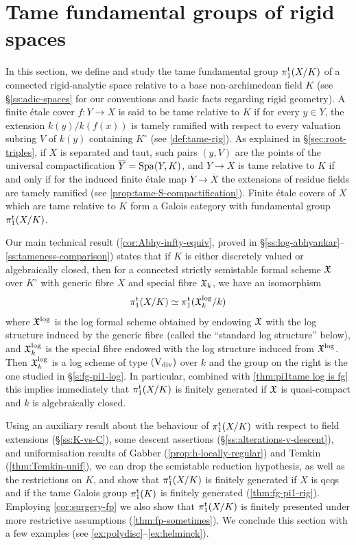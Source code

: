 \section{Tame fundamental groups of rigid spaces}
\label{s:fg-pi1-rig}


In this section, we define and study the tame fundamental group $\pi_1^{\mathrm{t}}(X/K)$ of a connected rigid-analytic space relative to a base non-archimedean field $K$ (see \S\ref{ss:adic-spaces} for our conventions and basic facts regarding rigid geometry). A finite \'etale cover $f\colon Y\to X$ is said to be tame relative to $K$ if for every $y\in Y$, the extension $k(y)/k(f(x))$ is tamely ramified with respect to every valuation subring $V$ of $k(y)$ containing $K^\circ$ (see \cref{def:tame-rig}). As explained in \S\ref{sec:root-triples}, if $X$ is separated and taut, such pairs $(y,V)$ are the points of the universal compactification $\overline{Y} = \operatorname{Spa}(Y, K)$, and $Y\to X$ is tame relative to $K$ if and only if for the induced finite \'etale map $\overline{Y}\to \overline{X}$ the extensions of residue fields are tamely ramified (see \cref{prop:tame-S-compactification}). Finite \'etale covers of $X$ which are tame relative to $K$ form a Galois category with fundamental group~$\pi_1^{\mathrm{t}}(X/K)$.

Our main technical result (\cref{cor:Abhy-infty-equiv}, proved in \S\ref{ss:log-abhyankar}--\ref{ss:tameness-comparison}) states that if $K$ is either discretely valued or algebraically closed, then for a connected strictly semistable formal scheme ${\mathfrak{X}}$ over $K^\circ$ with generic fibre $X$ and special fibre ${\mathfrak{X}}_k$, we have an isomorphism
\[
    \pi_1^{\mathrm{t}}(X/K) \simeq \pi_1^{\mathrm{t}}({\mathfrak{X}}^{\rm log}_k/k)
\]
where ${\mathfrak{X}}^{\rm log}$ is the log formal scheme obtained by endowing ${\mathfrak{X}}$ with the log structure induced by the generic fibre (called the ``standard log structure'' below), and ${\mathfrak{X}}^{\rm log}_k$ is the special fibre endowed with the log structure induced from ${\mathfrak{X}}^{\rm log}$. Then ${\mathfrak{X}}^{\rm log}_k$ is a log scheme of type $(\mathrm{V}_{\rm div})$ over $k$ and the group on the right is the one studied in \S\ref{s:fg-pi1-log}. In particular, combined with \cref{thm:pi1tame log is fg} this implies immediately that $\pi_1^{\mathrm{t}}(X/K)$ is finitely generated if ${\mathfrak{X}}$ is quasi-compact and $k$ is algebraically closed. 

Using an auxiliary result about the behaviour of $\pi_1^{\mathrm{t}}(X/K)$ with respect to field extensions (\S\ref{ss:K-vs-C}), some descent assertions (\S\ref{ss:alterations-v-descent}), and uniformisation results of Gabber (\cref{prop:h-locally-regular}) and Temkin (\cref{thm:Temkin-unif}), we can drop the semistable reduction hypothesis, as well as the restrictions on $K$, and show that $\pi_1^{\mathrm{t}}(X/K)$ is finitely generated if $X$ is qcqs and if the tame Galois group $\pi_1^{\mathrm{t}}(K)$ is finitely generated (\cref{thm:fg-pi1-rig}). Employing \cref{cor:surgery-fp} we also show that $\pi_1^{\mathrm{t}}(X/K)$ is finitely presented under more restrictive assumptions (\cref{thm:fp-sometimes}). We conclude this section with a few examples (see \cref{ex:polydisc}--\cref{ex:helminck}).


